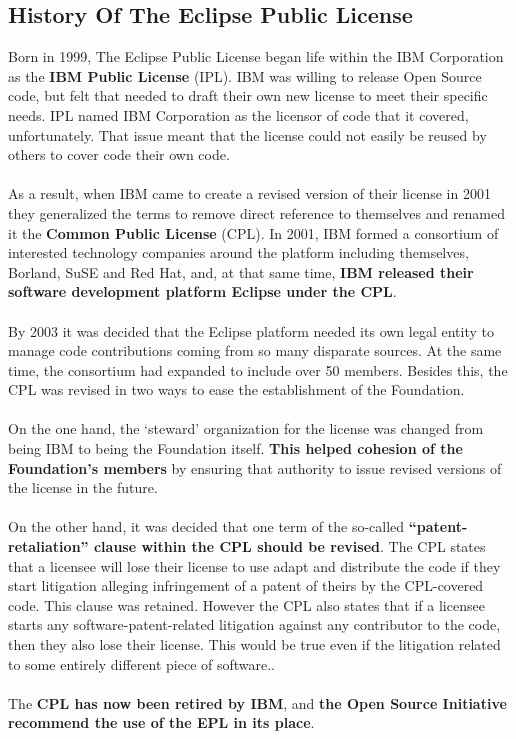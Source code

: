 \documentclass[a4paper, 12pt]{book}
\begin{document}
\subsection{History Of The Eclipse Public License}
Born in 1999, The Eclipse Public License began life within the IBM Corporation as the \textbf{IBM Public License} (IPL). IBM was willing to release Open Source code, but felt that needed to draft their own new license to meet their specific needs. IPL named IBM Corporation as the licensor of code that it covered, unfortunately. That issue meant that the license could not easily be reused by others to cover code their own code.\\
\\
As a result, when IBM came to create a revised version of their license in 2001 they generalized the terms to remove direct reference to themselves and renamed it the \textbf{Common Public License} (CPL). In 2001, IBM formed a consortium of interested technology companies around the platform including themselves, Borland, SuSE and Red Hat, and, at that same time, \textbf{IBM released their software development platform Eclipse under the CPL}.\\
\\
By 2003 it was decided that the Eclipse platform needed its own legal entity to manage code contributions coming from so many disparate sources. At the same time, the consortium had expanded to include over 50 members. Besides this, the CPL was revised in two ways to ease the establishment of the Foundation.\\
\\
On the one hand, the ‘steward’ organization for the license was changed from being IBM to being the Foundation itself. \textbf{This helped cohesion of the Foundation’s members} by ensuring that authority to issue revised versions of the license in the future.\\
\\
On the other hand, it was decided that one term of the so-called \textbf{``patent-retaliation'' clause within the CPL should be revised}. The CPL states that a licensee will lose their license to use adapt and distribute the code if they start litigation alleging infringement of a patent of theirs by the CPL-covered code. This clause was retained. However the CPL also states that if a licensee starts any software-patent-related litigation against any contributor to the code, then they also lose their license. This would be true even if the litigation related to some entirely different piece of software..\\
\\
The \textbf{CPL has now been retired by IBM}, and \textbf{the Open Source Initiative recommend the use of the EPL in its place}.
\end{document}
